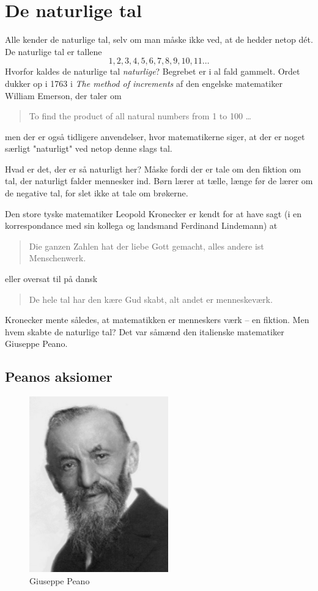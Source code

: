 \chapter{De naturlige tal}

Alle kender de naturlige tal, selv om man måske ikke ved, at de hedder netop dét. De naturlige tal er tallene
%
\[ 1, 2, 3, 4, 5, 6, 7, 8, 9, 10, 11 \ldots \]
%
Hvorfor kaldes de naturlige tal \emph{naturlige}? Begrebet er i al fald gammelt. Ordet dukker op i 1763 i \emph{The method of increments} af den engelske matematiker William Emerson, der taler om 
\begin{quote}
    To find the product of all natural numbers from 1 to 100 \ldots
\end{quote}
men der er også tidligere anvendelser, hvor matematikerne siger, at der er noget særligt "naturligt" ved netop denne slags tal.

Hvad er det, der er så naturligt her? Måske fordi der er tale om den fiktion om tal, der naturligt falder mennesker ind. Børn lærer at tælle, længe før de lærer om de negative tal, for slet ikke at tale om brøkerne.

Den store tyske matematiker Leopold Kronecker er kendt for at have sagt (i en korrespondance med sin kollega og landsmand Ferdinand Lindemann) at

\begin{quote}
    Die ganzen Zahlen hat der liebe Gott gemacht, alles andere ist Menschenwerk. 
\end{quote}

eller oversat til på dansk

\begin{quote}
    De hele tal har den kære Gud skabt, alt andet er menneskeværk.
\end{quote}

Kronecker mente således, at matematikken er menneskers værk -- en fiktion. Men hvem skabte de naturlige tal? Det var såmænd den italienske matematiker Giuseppe Peano.

\section{Peanos aksiomer}

\begin{figure}[h]
    \centering
    \includegraphics[width=6cm]{GiuseppePeano.jpg}
    \caption{Giuseppe Peano}
    \label{fig:peano}
\end{figure}

